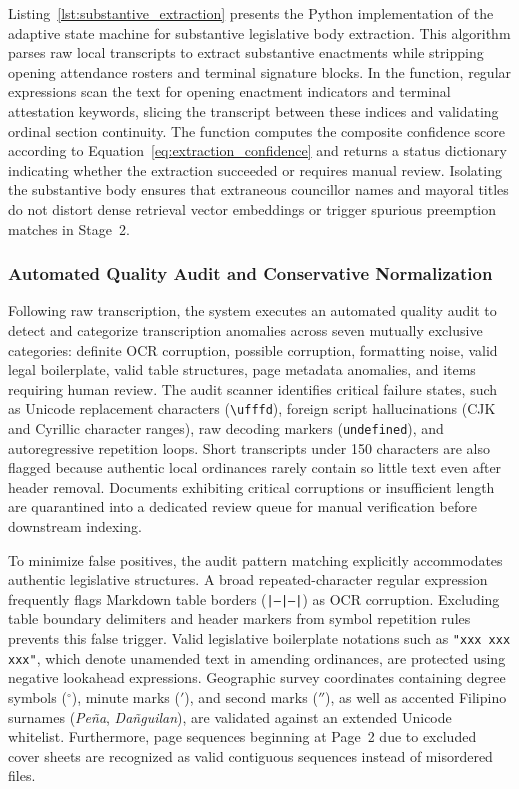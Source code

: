         Listing~\ref{lst:substantive_extraction} presents the Python implementation of the adaptive state machine for substantive legislative body extraction. This algorithm parses raw local transcripts to extract substantive enactments while stripping opening attendance rosters and terminal signature blocks. In the function, regular expressions scan the text for opening enactment indicators and terminal attestation keywords, slicing the transcript between these indices and validating ordinal section continuity. The function computes the composite confidence score according to Equation~\ref{eq:extraction_confidence} and returns a status dictionary indicating whether the extraction succeeded or requires manual review. Isolating the substantive body ensures that extraneous councillor names and mayoral titles do not distort dense retrieval vector embeddings or trigger spurious preemption matches in Stage~2.

        \subsubsection{Automated Quality Audit and Conservative Normalization}
        \label{sec:local_quality_audit}
        Following raw transcription, the system executes an automated quality audit to detect and categorize transcription anomalies across seven mutually exclusive categories: definite OCR corruption, possible corruption, formatting noise, valid legal boilerplate, valid table structures, page metadata anomalies, and items requiring human review. The audit scanner identifies critical failure states, such as Unicode replacement characters (\texttt{\textbackslash ufffd}), foreign script hallucinations (CJK and Cyrillic character ranges), raw decoding markers (\texttt{undefined}), and autoregressive repetition loops. Short transcripts under 150 characters are also flagged because authentic local ordinances rarely contain so little text even after header removal. Documents exhibiting critical corruptions or insufficient length are quarantined into a dedicated review queue for manual verification before downstream indexing.

        To minimize false positives, the audit pattern matching explicitly accommodates authentic legislative structures. A broad repeated-character regular expression frequently flags Markdown table borders (\texttt{|---|---|}) as OCR corruption. Excluding table boundary delimiters and header markers from symbol repetition rules prevents this false trigger. Valid legislative boilerplate notations such as \texttt{"xxx xxx xxx"}, which denote unamended text in amending ordinances, are protected using negative lookahead expressions. Geographic survey coordinates containing degree symbols ($^\circ$), minute marks ($'$), and second marks ($''$), as well as accented Filipino surnames (\textit{Pe\~na}, \textit{Dañguilan}), are validated against an extended Unicode whitelist. Furthermore, page sequences beginning at Page~2 due to excluded cover sheets are recognized as valid contiguous sequences instead of misordered files.


